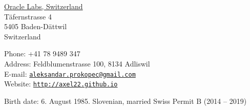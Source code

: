 \documentclass[9pt]{article}
\makeatletter
\def\myaddress{Feldblumenstrasse 100, 8134 Adliswil}
\def\myemail{aleksandar.prokopec@gmail.com}
\def\myweb{http://axel22.github.io}
\def\myphone{+41 78 9489 347}
\makeatother
\begin{document}
\begin{minipage}[t]{1.55in}
 \flushright \href{https://labs.oracle.com}{Oracle Labs, Switzerland}
   \\ \vspace{-0.03in} Täfernstrasse 4
   \\ \vspace{-0.03in} 5405 Baden-Dättwil
   \\ \vspace{-0.03in} Switzerland

\end{minipage}
\hfill
\hfill
\begin{minipage}[t]{2.7in}
  \flushright Phone: \myphone
  \\ \vspace{-0.03in} Address: \myaddress
  \\ \vspace{-0.03in} E-mail: \texttt{\href{mailto:\myemail}{\myemail}}
  \\ \vspace{-0.03in} Website: \texttt{\href{\myweb}{\myweb}}
\end{minipage}


\medskip
\medskip
\medskip

\reversemarginpar

\medskip

\medskip
{}

\noindent Birth date: 6. August 1985.
\newline\noindent Slovenian, married
\newline\noindent Swiss Permit B (2014 -- 2019)

\bigskip


\end{document}
